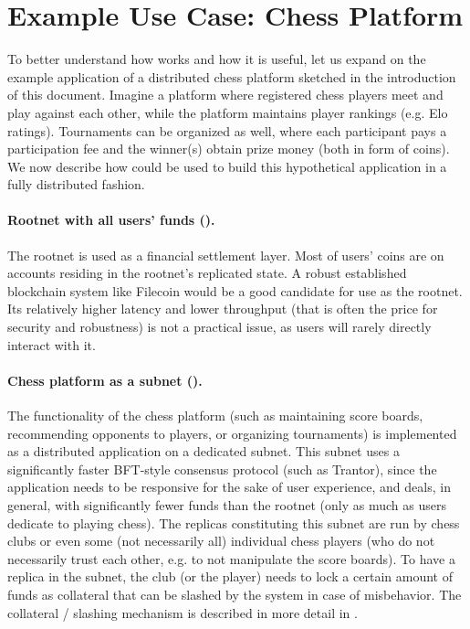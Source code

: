 \section{Example Use Case: Chess Platform}
\label{sec:example-use-case}

To better understand how \ipc works and how it is useful, let us expand on the example application of a distributed chess platform sketched in the introduction of this document.
Imagine a platform where registered chess players meet and play against each other, while the platform maintains player rankings (e.g. Elo ratings).
Tournaments can be organized as well, where each participant pays a participation fee and the winner(s) obtain prize money (both in form of coins).
We now describe how \ipc could be used to build this hypothetical application in a fully distributed fashion.

\paragraph{Rootnet with all users' funds ().}
The rootnet is used as a financial settlement layer.
Most of users' coins are on accounts residing in the rootnet's replicated state.
A robust established blockchain system like Filecoin would be a good candidate for use as the rootnet.
Its relatively higher latency and lower throughput (that is often the price for security and robustness) is not a practical issue,
as users will rarely directly interact with it.

\paragraph{Chess platform as a subnet ().}
The functionality of the chess platform
(such as maintaining score boards, recommending opponents to players, or organizing tournaments)
is implemented as a distributed application on a dedicated subnet.
This subnet uses a significantly faster BFT-style consensus protocol (such as Trantor),
since the application needs to be responsive for the sake of user experience,
and deals, in general, with significantly fewer funds than the rootnet (only as much as users dedicate to playing chess).
The replicas constituting this subnet are run by chess clubs or even some (not necessarily all) individual chess players
(who do not necessarily trust each other, e.g. to not manipulate the score boards).
To have a replica in the  subnet, the club (or the player) needs to lock a certain amount of funds as collateral that can be slashed by the system in case of misbehavior.
The collateral / slashing mechanism is described in more detail in .

